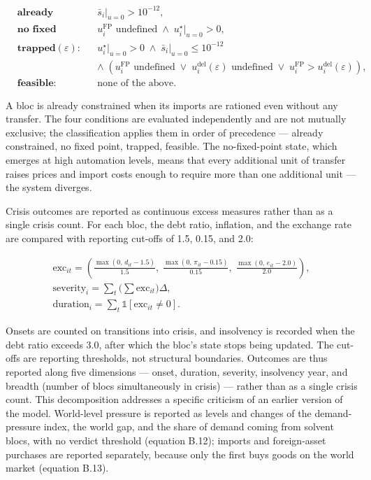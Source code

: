 \documentclass[preprint,review,12pt]{elsarticle}
\begin{document}
\[\begin{aligned}
&\textbf{already constrained:} && \bar{s}_i \big|_{u=0} > 10^{-12}, \\
&\textbf{no fixed point:} && u^{\mathrm{FP}}_i \text{ undefined} \;\wedge\; u^\star_i \big|_{u=0} > 0, \\
&\textbf{trapped}(\varepsilon): && u^\star_i \big|_{u=0} > 0 \;\wedge\; \bar{s}_i \big|_{u=0} \le 10^{-12} \\ &&& \wedge\; \left( u^{\mathrm{FP}}_i \text{ undefined} \;\vee\; u^{\mathrm{del}}_i(\varepsilon) \text{ undefined} \;\vee\; u^{\mathrm{FP}}_i > u^{\mathrm{del}}_i(\varepsilon) \right), \\
&\textbf{feasible:} && \text{none of the above.}
\end{aligned} \tag{46}\]

A bloc is already constrained when its imports are rationed even without
any transfer. The four conditions are evaluated independently and are
not mutually exclusive; the classification applies them in order of
precedence --- already constrained, no fixed point, trapped, feasible.
The no-fixed-point state, which emerges at high automation levels, means
that every additional unit of transfer raises prices and import costs
enough to require more than one additional unit --- the system diverges.

Crisis outcomes are reported as continuous excess measures rather than
as a single crisis count. For each bloc, the debt ratio, inflation, and
the exchange rate are compared with reporting cut-offs of 1.5, 0.15, and
2.0:

\[\begin{gathered} \mathrm{exc}_{it} = \left( \frac{\max(0,\, d_{it} - 1.5)}{1.5},\; \frac{\max(0,\, \pi_{it} - 0.15)}{0.15},\; \frac{\max(0,\, e_{it} - 2.0)}{2.0} \right), \\ \mathrm{severity}_i = \sum_t \Big( \sum \mathrm{exc}_{it} \Big) \Delta, \\ \mathrm{duration}_i = \sum_t \mathbb{1}\left[ \mathrm{exc}_{it} \neq 0 \right]. \end{gathered} \tag{47}\]

Onsets are counted on transitions into crisis, and insolvency is
recorded when the debt ratio exceeds 3.0, after which the bloc's state
stops being updated. The cut-offs are reporting thresholds, not
structural boundaries. Outcomes are thus reported along five dimensions
--- onset, duration, severity, insolvency year, and breadth (number of
blocs simultaneously in crisis) --- rather than as a single crisis
count. This decomposition addresses a specific criticism of an earlier
version of the model. World-level pressure is reported as levels and
changes of the demand-pressure index, the world gap, and the share of
demand coming from solvent blocs, with no verdict threshold (equation
B.12); imports and foreign-asset purchases are reported separately,
because only the first buys goods on the world market (equation B.13).
\end{document}
